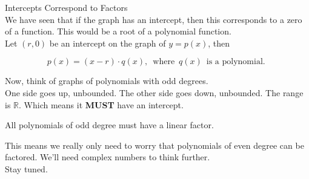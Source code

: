 \documentclass{ximera}
\begin{document}
\begin{idea} Intercepts Correspond to Factors \\



We have seen that if the graph has an intercept, then this corresponds to a zero of a function.  This would be a root of a polynomial function. \\

Let $(r, 0)$ be an intercept on the graph of $y = p(x)$, then 

\[
p(x) = (x-r) \cdot q(x), \, \text{ where } \, q(x) \, \text{ is a polynomial. }
\]

Now, think of graphs of polynomials with odd degrees. \\

One side goes up, unbounded.  The other side goes down, unbounded.  The range is $\mathbb{R}$.  Which means it \textbf{MUST} have an intercept.


All polynomials of odd degree must have a linear factor.




\end{idea}


This means we really only need to worry that polynomials of even degree can be factored.  We'll need complex numbers to think further. \\


Stay tuned.
\end{document}
